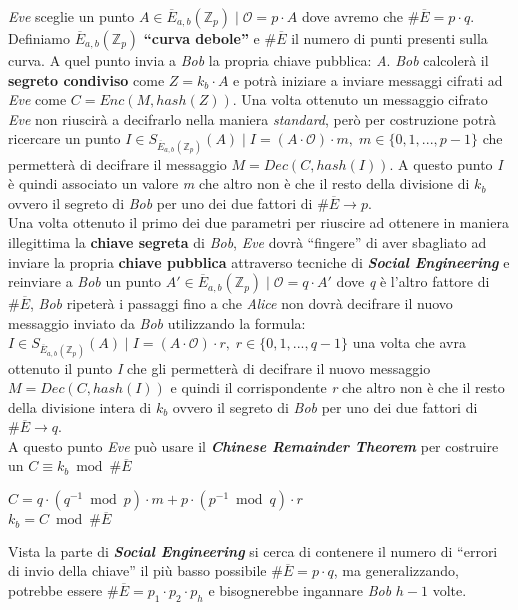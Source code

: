 \textit{Eve} sceglie un punto $A \in \overline{E}_{a, b}(\mathbb{Z}_p) \; | \; \mathcal{O} = p \cdot A$ dove avremo che $\#\overline{E} = p \cdot q$. Definiamo $\overline{E}_{a, b}(\mathbb{Z}_p)$ \textbf{``curva debole''} e $\#\overline{E}$ il numero di punti presenti sulla curva. A quel punto invia a \textit{Bob} la propria chiave pubblica: \textit{A}. \textit{Bob} calcolerà il \textbf{segreto condiviso} come $Z = k_b \cdot A$ e potrà iniziare a inviare messaggi cifrati ad \textit{Eve} come $C = Enc(M, hash(Z))$. Una volta ottenuto un messaggio cifrato \textit{Eve} non riuscirà a decifrarlo nella maniera \textit{standard}, però per costruzione potrà ricercare un punto $I \in S_{\overline{E}_{a, b}(\mathbb{Z}_p)}(A) \; | \; I = (A \cdot \mathcal{O}) \cdot m, \; m \in \{0, 1, ..., p - 1\}$ che permetterà di decifrare il messaggio $M = Dec(C, hash(I))$. A questo punto \textit{I} è quindi associato un valore \textit{m} che altro non è che il resto della divisione di $k_b$ ovvero il segreto di \textit{Bob} per uno dei due fattori di $\#\overline{E} \rightarrow p$. \\
Una volta ottenuto il primo dei due parametri per riuscire ad ottenere in maniera illegittima la \textbf{chiave segreta} di \textit{Bob}, \textit{Eve} dovrà ``fingere'' di aver sbagliato ad inviare la propria \textbf{chiave pubblica} attraverso tecniche di \textbf{\textit{Social Engineering}} e reinviare a \textit{Bob} un punto $A' \in \overline{E}_{a, b}(\mathbb{Z}_p) \; | \; \mathcal{O} = q \cdot A'$ dove \textit{q} è l'altro fattore di $\#\overline{E}$, \textit{Bob} ripeterà i passaggi fino a che \textit{Alice} non dovrà decifrare il nuovo messaggio inviato da \textit{Bob} utilizzando la formula: $I \in S_{\overline{E}_{a, b}(\mathbb{Z}_p)}(A) \; | \; I = (A \cdot \mathcal{O}) \cdot r, \; r \in \{0, 1, ..., q - 1\}$ una volta che avra ottenuto il punto \textit{I} che gli permetterà di decifrare il nuovo messaggio $M = Dec(C, hash(I))$ e quindi il corrispondente \textit{r} che altro non è che il resto della divisione intera di $k_b$ ovvero il segreto di \textit{Bob} per uno dei due fattori di $\#\overline{E} \rightarrow q$. \\
A questo punto \textit{Eve} può usare il \textbf{\textit{Chinese Remainder Theorem}} per costruire un $C \equiv k_b \bmod \#\overline{E}$
\begin{center}
        $C = q \cdot (q^{-1} \bmod p) \cdot m + p \cdot (p^{-1} \bmod q) \cdot r$ \\
        $k_b = C \bmod \#\overline{E}$
\end{center}
Vista la parte di \textbf{\textit{Social Engineering}} si cerca di contenere il numero di ``errori di invio della chiave'' il più basso possibile $\#\overline{E} = p \cdot q$, ma generalizzando, potrebbe essere $\#\overline{E} = p_1 \cdot p_2 \cdot p_h$ e bisognerebbe ingannare \textit{Bob} $h - 1$ volte.

